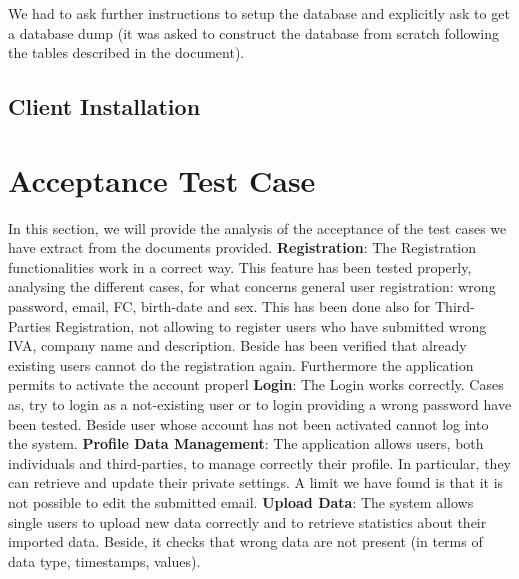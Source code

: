 \documentclass[a4paper]{article}
\begin{document}
We had to ask further instructions to setup the database and explicitly ask to get a database dump (it was asked to construct the database from scratch following the tables described in the document).\\

\subsection{Client Installation}

\newpage
\section{Acceptance Test Case}
In this section, we will provide the analysis of the acceptance of the test cases we have extract from the documents provided. \newline\newline
\textbf{Registration}:\newline
The Registration functionalities work in a correct way. This feature has been tested properly, analysing the different cases, for what concerns general user registration: wrong password, email, FC, birth-date and sex. This has been done also for Third-Parties Registration, not allowing to register users who have submitted wrong IVA, company name and description.\newline
Beside has been verified that already existing users cannot do the registration again. Furthermore the application permits to activate the account properl
\newline\newline
\textbf{Login}:\newline
The Login works correctly. Cases as, try to login as a not-existing user or to login providing a wrong password have been tested. Beside user whose account has not been activated cannot log into the system.
\newline\newline
\textbf{Profile Data Management}:\newline
The application allows users, both individuals and third-parties, to manage correctly their profile. In particular, they can retrieve and update their private settings. A limit we have found is that it is not possible to edit the submitted email.
\newline\newline
\textbf{Upload Data}:\newline
The system allows single users to upload new data correctly and to retrieve statistics about their imported data. Beside, it checks that wrong data  are not present (in terms of data type, timestamps, values).\newline
\end{document}
